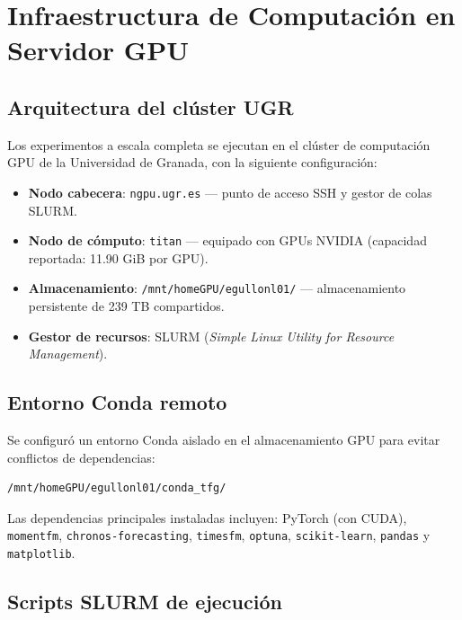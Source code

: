 \documentclass[12pt, a4paper]{article}
\newcommand{\code}[1]{\texttt{#1}}
\begin{document}
\section{Infraestructura de Computación en Servidor GPU}
\label{sec:infraestructura}

\subsection{Arquitectura del clúster UGR}

Los experimentos a escala completa se ejecutan en el clúster de computación GPU de la Universidad de Granada, con la siguiente configuración:

\begin{itemize}
    \item \textbf{Nodo cabecera}: \code{ngpu.ugr.es} --- punto de acceso SSH y gestor de colas SLURM.
    \item \textbf{Nodo de cómputo}: \code{titan} --- equipado con GPUs NVIDIA (capacidad reportada: 11.90 GiB por GPU).
    \item \textbf{Almacenamiento}: \code{/mnt/homeGPU/egullonl01/} --- almacenamiento persistente de 239 TB compartidos.
    \item \textbf{Gestor de recursos}: SLURM (\textit{Simple Linux Utility for Resource Management}).
\end{itemize}

\subsection{Entorno Conda remoto}

Se configuró un entorno Conda aislado en el almacenamiento GPU para evitar conflictos de dependencias:
\begin{verbatim}
/mnt/homeGPU/egullonl01/conda_tfg/
\end{verbatim}

Las dependencias principales instaladas incluyen: PyTorch (con CUDA), \code{momentfm}, \code{chronos-forecasting}, \code{timesfm}, \code{optuna}, \code{scikit-learn}, \code{pandas} y \code{matplotlib}.

\subsection{Scripts SLURM de ejecución}
\end{document}
